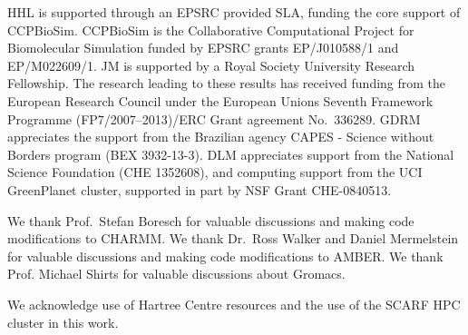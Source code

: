 \documentclass[journal=jctcce,manuscript=article]{achemso}
\begin{document}
\begin{acknowledgement}
  HHL is supported through an EPSRC provided SLA, funding the core
  support of CCPBioSim.  CCPBioSim is the Collaborative Computational
  Project for Biomolecular Simulation funded by EPSRC grants
  EP/J010588/1 and EP/M022609/1.  JM is supported by a Royal Society
  University Research Fellowship.  The research leading to these
  results has received funding from the European Research Council
  under the European Unions Seventh Framework Programme
  (FP7/2007--2013)/ERC Grant agreement No.\ 336289.  GDRM appreciates
  the support from the Brazilian agency CAPES - Science without
  Borders program (BEX 3932-13-3).  DLM appreciates support from the
  National Science Foundation (CHE 1352608), and computing support
  from the UCI GreenPlanet cluster, supported in part by NSF Grant
  CHE-0840513.

  We thank Prof.\ Stefan Boresch for valuable discussions and making code
  modifications to CHARMM.  We thank Dr.\ Ross Walker and Daniel Mermelstein
  for valuable discussions and making code modifications to AMBER.  We thank
  Prof. Michael Shirts for valuable discussions about Gromacs.

  We acknowledge use of Hartree Centre resources and the use of the
  SCARF HPC cluster in this work.
\end{acknowledgement}



\end{document}
